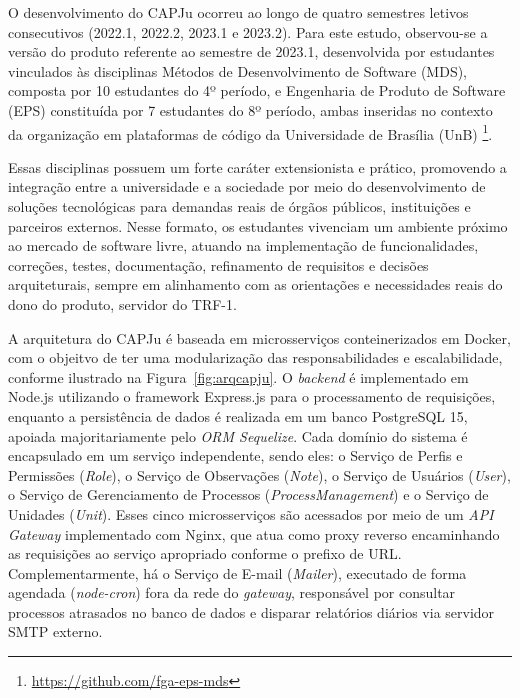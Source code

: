 O desenvolvimento do CAPJu ocorreu ao longo de quatro semestres letivos consecutivos (2022.1, 2022.2, 2023.1 e 2023.2). Para este estudo, observou-se a versão do produto referente ao semestre de 2023.1, desenvolvida por estudantes vinculados às disciplinas Métodos de Desenvolvimento de Software (MDS), composta por 10 estudantes do 4º período, e Engenharia de Produto de Software (EPS) constituída por 7 estudantes do 8º período, ambas inseridas no contexto da organização em plataformas de código da Universidade de Brasília (UnB) \footnote{\url{https://github.com/fga-eps-mds}}. 



Essas disciplinas possuem um forte caráter extensionista e prático, promovendo a integração entre a universidade e a sociedade por meio do desenvolvimento de soluções tecnológicas para demandas reais de órgãos públicos, instituições e parceiros externos. Nesse formato, os estudantes vivenciam um ambiente próximo ao mercado de software livre, atuando na implementação de funcionalidades, correções, testes, documentação, refinamento de requisitos e decisões arquiteturais, sempre em alinhamento com as orientações e necessidades reais do dono do produto, servidor do TRF-1.


A arquitetura do CAPJu é baseada em microsserviços conteinerizados em Docker, com o objeitvo de ter uma modularização das responsabilidades e escalabilidade, conforme ilustrado na Figura~\ref{fig:arqcapju}. O \textit{backend} é implementado em Node.js utilizando o framework Express.js para o processamento de requisições, enquanto a persistência de dados é realizada em um banco PostgreSQL 15, apoiada majoritariamente pelo \textit{ORM Sequelize}. Cada domínio do sistema é encapsulado em um serviço independente, sendo eles: o Serviço de Perfis e Permissões (\textit{Role}), o Serviço de Observações (\textit{Note}), o Serviço de Usuários (\textit{User}), o Serviço de Gerenciamento de Processos (\textit{ProcessManagement}) e o Serviço de Unidades (\textit{Unit}). Esses cinco microsserviços são acessados por meio de um \textit{API Gateway} implementado com Nginx, que atua como proxy reverso encaminhando as requisições ao serviço apropriado conforme o prefixo de URL. Complementarmente, há o Serviço de E-mail (\textit{Mailer}), executado de forma agendada (\textit{node-cron}) fora da rede do \textit{gateway}, responsável por consultar processos atrasados no banco de dados e disparar relatórios diários via servidor SMTP externo.

